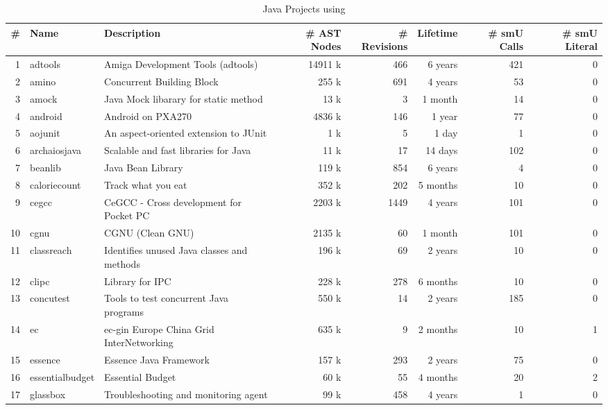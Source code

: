 \begin{table*}[htb]
\centering
\caption{Java Projects using \smu{}} 
\label{table:projects}
\begin{tabularx}{\textwidth}{|r|l|X|r|r|r|r|r|}
  \hline
\# & Name & Description & \# AST Nodes & \# Revisions & Lifetime & \# smU Calls & \# smU Literal \\ 
  \hline
1 & adtools & Amiga Development Tools (adtools) & 14911 k & 466 & 6 years & 421 &   0 \\ 
  2 & amino & Concurrent Building Block & 255 k & 691 & 4 years &  53 &   0 \\ 
  3 & amock & Java Mock libarary for static method & 13 k &   3 & 1 month &  14 &   0 \\ 
  4 & android & Android on PXA270 & 4836 k & 146 & 1 year &  77 &   0 \\ 
  5 & aojunit & An aspect-oriented extension to JUnit & 1 k &   5 & 1 day &   1 &   0 \\ 
  6 & archaiosjava & Scalable and fast libraries for Java & 11 k &  17 & 14 days & 102 &   0 \\ 
  7 & beanlib & Java Bean Library & 119 k & 854 & 6 years &   4 &   0 \\ 
  8 & caloriecount & Track what you eat & 352 k & 202 & 5 months &  10 &   0 \\ 
  9 & cegcc & CeGCC - Cross development for Pocket PC & 2203 k & 1449 & 4 years & 101 &   0 \\ 
  10 & cgnu & CGNU (Clean GNU) & 2135 k &  60 & 1 month & 101 &   0 \\ 
  11 & classreach & Identifies unused Java classes and methods & 196 k &  69 & 2 years &  10 &   0 \\ 
  12 & clipc & Library for IPC & 228 k & 278 & 6 months &  10 &   0 \\ 
  13 & concutest & Tools to test concurrent Java programs & 550 k &  14 & 2 years & 185 &   0 \\ 
  14 & ec & ec-gin Europe China Grid InterNetworking & 635 k &   9 & 2 months &  10 &   1 \\ 
  15 & essence & Essence Java Framework & 157 k & 293 & 2 years &  75 &   0 \\ 
  16 & essentialbudget & Essential Budget & 60 k &  55 & 4 months &  20 &   2 \\ 
  17 & glassbox & Troubleshooting and monitoring agent & 99 k & 458 & 4 years &   1 &   0 \\ 

\end{tabularx}
\end{table*}

